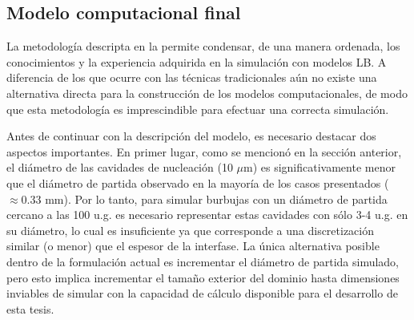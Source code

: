 \subsection{Modelo computacional final}


La metodolog\'ia descripta en la  permite condensar, de una manera ordenada, los conocimientos y la experiencia adquirida en la simulaci\'on con modelos LB. A diferencia de los que ocurre con las t\'ecnicas tradicionales a\'un no existe una alternativa directa para la construcci\'on de los modelos computacionales, de modo que esta metodolog\'ia es imprescindible para efectuar una correcta simulaci\'on.

Antes de continuar con la descripci\'on del modelo, es necesario destacar dos aspectos importantes. En primer lugar, como se mencion\'o en la secci\'on anterior, el di\'ametro de las cavidades de nucleaci\'on (10 $\mu$m) es significativamente menor que el di\'ametro de partida observado en la mayor\'ia de los casos presentados ($\approx0.33$ mm). Por lo tanto, para simular burbujas con un di\'ametro de partida cercano a las 100 u.g. es necesario representar estas cavidades con s\'olo 3-4 u.g. en su di\'ametro, lo cual es insuficiente ya que corresponde a una discretizaci\'on similar (o menor) que el espesor de la interfase. La \'unica alternativa posible dentro de la formulaci\'on actual es incrementar el di\'ametro de partida simulado, pero esto implica incrementar el tama\~no exterior del dominio hasta dimensiones inviables de simular con la capacidad de c\'alculo disponible para el desarrollo de esta tesis.

